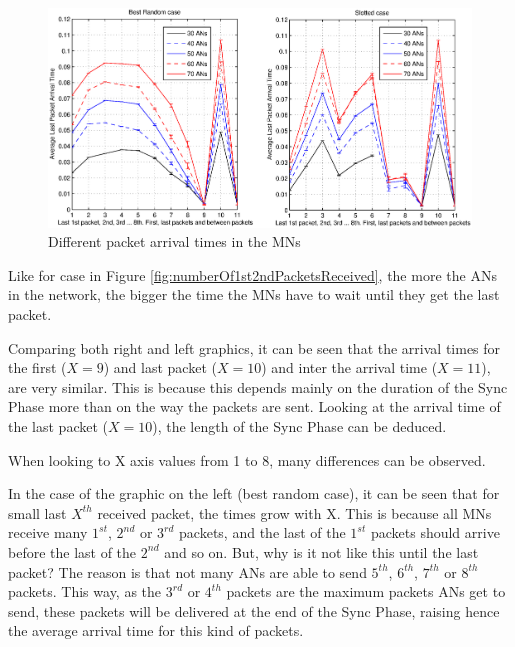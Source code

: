 \begin{figure}[ht]
 \begin{center}
  \includegraphics[width=1\textwidth]{Lastarrivalpackettimes.eps}
 \end{center}
 \caption{Different packet arrival times in the \acp{MN}}
 \label{fig:Lastarrivalpackettimes}
\end{figure}

Like for case in Figure \ref{fig:numberOf1st2ndPacketsReceived}, the more the \acp{AN} in the network, the bigger the time the \acp{MN} have to wait 
until they get the last packet.

Comparing both right and left graphics, it can be seen that the arrival times for the first ($X=9$) and last packet ($X=10$) and inter the arrival 
time ($X=11$), are very similar. This is because this depends mainly on the duration of the Sync Phase more than on the way the packets are sent. 
Looking at the arrival time of the last packet ($X=10$), the length of the Sync Phase can be deduced.

When looking to X axis values from 1 to 8, many differences can be observed.

In the case of the graphic on the left (best random case), it can be seen that for small last $X^{th}$ received packet, the times grow with X. 
This is because all \acp{MN} receive many $1^{st}$, $2^{nd}$ or $3^{rd}$ packets, and the last of the $1^{st}$ packets should arrive 
before the last of the $2^{nd}$ and so on. But, why is it not like this until the last packet? The reason is that not many \acp{AN} are able to send
$5^{th}$, $6^{th}$, $7^{th}$ or $8^{th}$ packets. This way, as the $3^{rd}$ or $4^{th}$ packets are the maximum packets \acp{AN} get to send, 
these packets will be delivered at the end of the Sync Phase, raising hence the average arrival time for this kind of packets.

